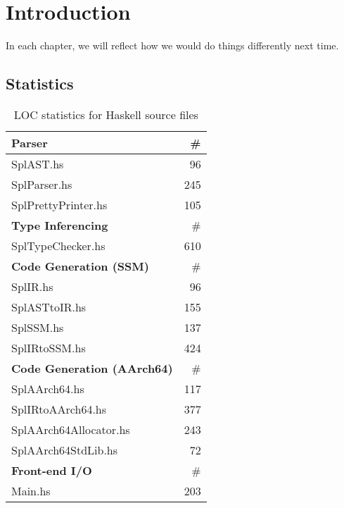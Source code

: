 \chapter*{Introduction}


In each chapter, we will reflect how we would do things differently next time.


\section*{Statistics}

\begin{table}[ht!]
	\centering
	\begin{tabular}{|l|r|}
		\hline
		\textbf{Parser} 	& \# \\
		\hline
		SplAST.hs 			& 96 \\
		SplParser.hs 		& 245 \\
		SplPrettyPrinter.hs & 105 \\

		\hline
		\textbf{Type Inferencing} & \# \\
		\hline
		SplTypeChecker.hs 	& 610 \\

		\hline
		\textbf{Code Generation (SSM)} & \# \\
		\hline
		SplIR.hs 			& 96 \\
		SplASTtoIR.hs 		& 155 \\
		SplSSM.hs 			& 137 \\
		SplIRtoSSM.hs 		& 424 \\

		\hline
		\textbf{Code Generation (AArch64)} & \# \\
		\hline
		SplAArch64.hs 		& 117 \\
		SplIRtoAArch64.hs 	& 377 \\
		SplAArch64Allocator.hs & 243 \\
		SplAArch64StdLib.hs & 72 \\

		\hline
		\textbf{Front-end I/O} & \# \\
		\hline
		Main.hs 			& 203 \\
		\hline
	\end{tabular}
	\caption{LOC statistics for Haskell source files}
\end{table}
